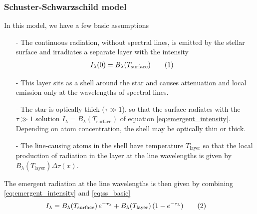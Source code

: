 \documentclass{article}
\newcommand\numberthis{\addtocounter{equation}{1}\tag{\theequation}}
\begin{document}
\subsubsection*{Schuster-Schwarzschild model}
In this model, we have a few basic assumptions
\begin{itemize}
  \item[-]The continuous radiation, without spectral lines, is emitted by the stellar surface and irradiates a separate layer with the intensity
    \begin{align*}
      I_{\lambda}(0) &= B_{\lambda}(T_{\text{surface}})\numberthis\label{eq:ss_basic}
    \end{align*}
  \item[-]This layer sits as a shell around the star and causes attenuation and local emission only at the wavelengths of spectral lines.
  \item[-]The star is optically thick ($\tau\gg1$), so that the surface radiates with the $\tau\gg1$ solution $I_{\lambda} = B_{\lambda}(T_{\text{surface}})$ of equation \eqref{eq:emergent_intensity}. Depending on atom concentration, the shell may be optically thin or thick.
  \item[-]The line-causing atoms in the shell have temperature $T_{\text{layer}}$ so that the local production of radiation in the layer at the line wavelengths is given by $B_{\lambda}(T_{\text{layer}})\Delta\tau(x)$.
\end{itemize}
The emergent radiation at the line wavelengths is then given by combining \eqref{eq:emergent_intensity} and \eqref{eq:ss_basic}
\begin{align*}
  I_{\lambda} &= B_{\lambda}(T_{\text{surface}})\,e^{-\tau_{\lambda}}+B_{\lambda}(T_{\text{layer}})\,(1-e^{-\tau_{\lambda}}) \numberthis\label{eq:ss_full}
\end{align*}
\end{document}

